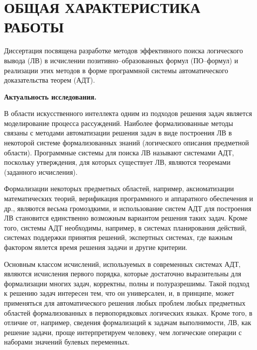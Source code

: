 \documentclass[a4paper]{report}
\begin{document}
\newpage

\section*{ОБЩАЯ ХАРАКТЕРИСТИКА РАБОТЫ}

Диссертация посвящена разработке методов эффективного поиска логического вывода (ЛВ) в исчислении позитивно--образованных формул (ПО--формул) и реализации этих методов в форме программной системы автоматического доказательства теорем (АДТ).

\textbf{Актуальность исследования.}

В области искусственного интеллекта одним из подходов решения задач является моделирование процесса рассуждений. Наиболее формализованные методы связаны с методами автоматизации решения задач в виде построения ЛВ в некоторой системе формализованных знаний (логического описания предметной области). Программные системы для поиска ЛВ называют системами АДТ, поскольку утверждения, для которых существует ЛВ, являются теоремами (заданного исчисления).

Формализации некоторых предметных областей, например, аксиоматизации математических теорий, верификация программного и аппаратного обеспечения и др., являются весьма громоздкими, и использование систем АДТ для построения ЛВ становится единственно возможным вариантом решения таких задач. Кроме того, системы АДТ необходимы, например, в системах планирования действий, системах поддержки принятия решений, экспертных системах, где важным фактором явлется время решения задачи и другие критерии.



Основным классом исчислений, используемых в современных системах АДТ, являются исчисления первого порядка, которые достаточно выразительны для формализации многих задач, корректны, полны и полуразрешимы. Такой подход к решению задач интересен тем, что он универсален, и, в принципе, может применяться для автоматического решения любых проблем любых предметных областей формализованных в первопорядковых логических языках. Кроме того, в отличие от, например, сведения формализаций к задачам выполнимости, ЛВ, как решение задачи, проще интерпретируем человеку, чем логические операции с наборами значений булевых переменных.
\end{document}
